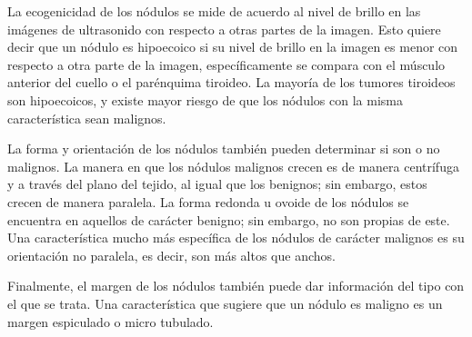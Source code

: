 La ecogenicidad de los nódulos se mide de acuerdo al nivel de brillo en las imágenes de ultrasonido con respecto a otras partes de la imagen. Esto quiere decir que un nódulo es hipoecoico si su nivel de brillo en la imagen es menor con respecto a otra parte de la imagen, específicamente se compara con el músculo anterior del cuello o el parénquima tiroideo. La mayoría de los tumores tiroideos son hipoecoicos, y existe mayor riesgo de que los nódulos con la misma característica sean malignos.

La forma y orientación de los nódulos también pueden determinar si son o no malignos. La manera en que los nódulos malignos crecen es de manera centrífuga y a través del plano del tejido, al igual que los benignos; sin embargo, estos crecen de manera paralela. La forma redonda u ovoide de los nódulos se encuentra en aquellos de carácter benigno; sin embargo, no son propias de este. Una característica mucho más específica de los nódulos de carácter malignos es su orientación no paralela, es decir, son más altos que anchos.

Finalmente, el margen de los nódulos también puede dar información del tipo con el que se trata. Una característica que sugiere que un nódulo es maligno es un margen espiculado o micro tubulado.

